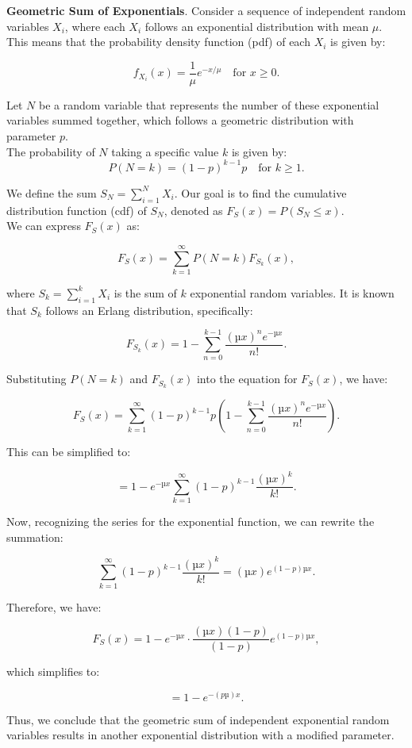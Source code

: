 \begin{example}
    \textbf{Geometric Sum of Exponentials}. Consider a sequence of independent random variables \( X_i \), where each \( X_i \) follows an exponential distribution with mean \( \mu \). This means that the probability density function (pdf) of each \( X_i \) is given by:

    \[
    f_{X_i}(x) = \frac{1}{\mu} e^{-x/\mu} \quad \text{for } x \geq 0.
    \]
    
    Let \( N \) be a random variable that represents the number of these exponential variables summed together, which follows a geometric distribution with parameter \( p \). \\ 
    
    The probability of \( N \) taking a specific value \( k \) is given by:
    \[
    P(N = k) = (1 - p)^{k-1} p \quad \text{for } k \geq 1.
    \]
    
    We define the sum \( S_N = \sum_{i=1}^N X_i \). Our goal is to find the cumulative distribution function (cdf) of \( S_N \), denoted as \( F_S(x) = P(S_N \leq x) \).\\
    
    We can express \( F_S(x) \) as:
    
    \[
    F_S(x) = \sum_{k=1}^{\infty} P(N = k) F_{S_k}(x),
    \]
    
    where \( S_k = \sum_{i=1}^k X_i \) is the sum of \( k \) exponential random variables. It is known that \( S_k \) follows an Erlang distribution, specifically:
    
    \[
    F_{S_k}(x) = 1 - \sum_{n=0}^{k-1} \frac{(µx)^n e^{-µx}}{n!}.
    \]
    
    Substituting \( P(N = k) \) and \( F_{S_k}(x) \) into the equation for \( F_S(x) \), we have:
    
    \[
    F_S(x) = \sum_{k=1}^{\infty} (1 - p)^{k-1} p \left( 1 - \sum_{n=0}^{k-1} \frac{(µx)^n e^{-µx}}{n!} \right).
    \]
    
    This can be simplified to:
    
    \[
    = 1 - e^{-µx} \sum_{k=1}^{\infty} (1 - p)^{k-1} \frac{(µx)^k}{k!}.
    \]
    
    Now, recognizing the series for the exponential function, we can rewrite the summation:
    
    \[
    \sum_{k=1}^{\infty} (1 - p)^{k-1} \frac{(µx)^k}{k!} = (µx) e^{(1 - p) µ x}.
    \]
    
    Therefore, we have:
    
    \[
    F_S(x) = 1 - e^{-µx} \cdot \frac{(µx)(1 - p)}{(1 - p)} e^{(1 - p) µ x},
    \]
    
    which simplifies to:
    
    \[
    = 1 - e^{-(pµ)x}.
    \]
    
    Thus, we conclude that the geometric sum of independent exponential random variables results in another exponential distribution with a modified parameter.
\end{example}

